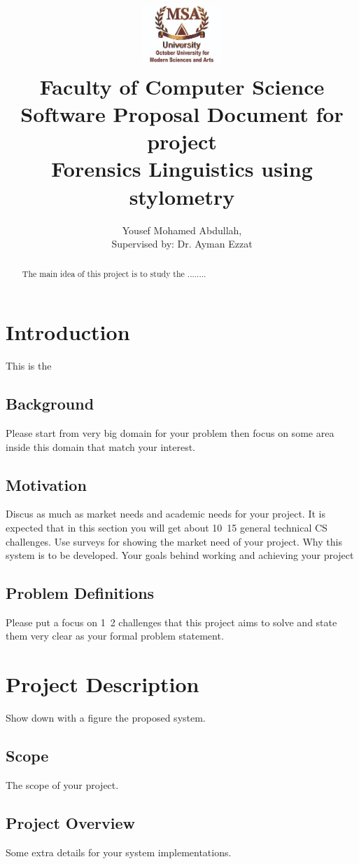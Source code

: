 \documentclass[12pt]{article}
\title{
{\includegraphics[width=3cm, height=2.5cm]{MSALogo.jpg}}\\
{\large Faculty of Computer Science}\\
{Software Proposal Document for project \\
Forensics Linguistics using stylometry}
}
\author{Yousef Mohamed Abdullah, \\ Supervised by: Dr. Ayman Ezzat}
\date{}
\begin{document}
\maketitle
\newpage
\tableofcontents
\newpage
{}

\begin{abstract}
    The main idea of this project is to study the ........

\end{abstract}

\section{Introduction}
This is the
\subsection{Background}
Please start from very big domain for your problem then focus on some area inside this domain that match your interest.
\subsection{Motivation}
Discus as much as market needs and academic needs for your project. It is expected that in this section you will get about 10~15 general technical CS challenges. Use surveys for showing the market need of your project.
Why this system is to be developed.
Your goals behind working and achieving your project
\subsection{Problem Definitions}
Please put a focus on 1~2 challenges that this project aims to solve and state them very clear as your formal problem statement.

\section{Project Description}
Show down with a figure the proposed system.
\subsection{Scope}
The scope of your project.
\subsection{Project Overview}
Some extra details for your system implementations.
\end{document}
